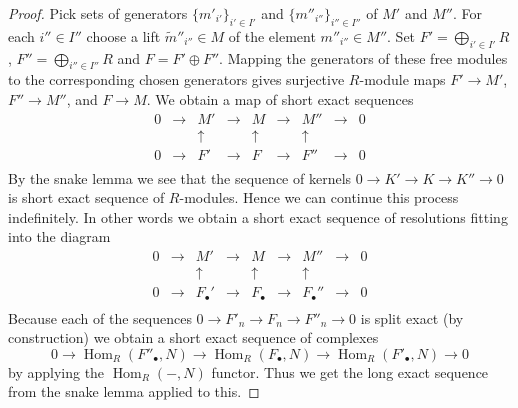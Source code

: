 \documentclass[10pt,a4paper]{amsart}
\theoremstyle{plain}
\theoremstyle{definition}
\theoremstyle{remark}
\numberwithin{equation}{subsection}
\def\Hom{\mathop{\mathrm{Hom}}\nolimits}
\begin{document}
\begin{proof}
Pick sets of generators $\{m'_{i'}\}_{i' \in I'}$ and
$\{m''_{i''}\}_{i'' \in I''}$ of $M'$ and $M''$.
For each $i'' \in I''$ choose a lift $\tilde m''_{i''} \in M$
of the element $m''_{i''} \in M''$. Set $F' = \bigoplus_{i' \in I'} R$,
$F'' = \bigoplus_{i'' \in I''} R$ and $F = F' \oplus F''$.
Mapping the generators of these free modules to the corresponding
chosen generators gives surjective $R$-module maps $F' \to M'$,
$F'' \to M''$, and $F \to M$. We obtain a map of short exact sequences
$$
\begin{matrix}
0 & \to & M' & \to & M & \to & M'' & \to & 0 \\
& & \uparrow & & \uparrow & & \uparrow \\
0 & \to & F' & \to & F & \to & F'' & \to & 0 \\
\end{matrix}
$$
By the snake lemma we see that the sequence of kernels
$0 \to K' \to K \to K'' \to 0$ is short exact sequence of $R$-modules.
Hence we can continue this process indefinitely. In other words
we obtain a short exact sequence of resolutions fitting into the diagram
$$
\begin{matrix}
0 & \to & M' & \to & M & \to & M'' & \to & 0 \\
& & \uparrow & & \uparrow & & \uparrow \\
0 & \to & F_\bullet' & \to & F_\bullet & \to & F_\bullet'' & \to & 0 \\
\end{matrix}
$$
Because each of the sequences $0 \to F'_n \to F_n \to F''_n \to 0$
is split exact (by construction) we obtain a short exact sequence of
complexes
$$
0 \to
\Hom_R(F''_{\bullet}, N) \to
\Hom_R(F_{\bullet}, N) \to
\Hom_R(F'_{\bullet}, N) \to
0
$$
by applying the $\Hom_R(-, N)$ functor.
Thus we get the long exact sequence from
the snake lemma applied to this.
\end{proof}
\end{document}
